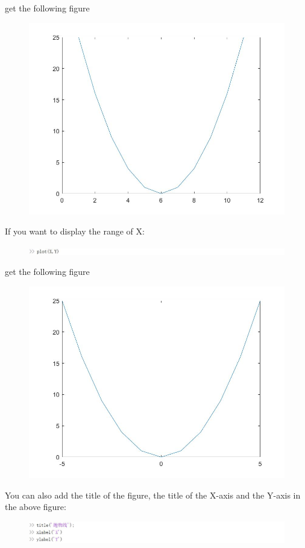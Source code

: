 \documentclass[10pt,math=newtx,citestyle=gb7714-2015,bibstyle=gb7714-2015]{elegantbook}
\begin{document}
{{{	get the following figure
	\begin{figure}[htbp!]
		\centering
		\includegraphics[width=0.8\linewidth]{FIG/Y.jpg}
		\centering
	\end{figure}
	
	If you want to display the range of X:
	\begin{figure}[htbp!]
		\centering
		\includegraphics[width=0.8\linewidth]{FIG/XYplot.jpg}
		\centering
	\end{figure}
	
	get the following figure
	\begin{figure}[htbp!]
		\centering
		\includegraphics[width=0.8\linewidth]{FIG/XY.jpg}
		\centering
	\end{figure}
	
	You can also add the title of the figure, the title of the X-axis and the Y-axis in the above figure:
	\begin{figure}[htbp!]
		\centering
		\includegraphics[width=0.8\linewidth]{FIG/title.jpg}
		\centering
	\end{figure}
	
}}}
\end{document}
